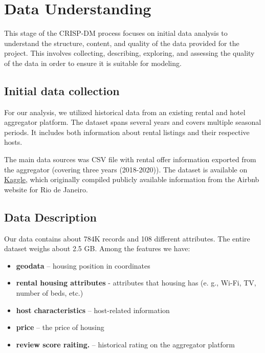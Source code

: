 

\section{Data Understanding}
\label{chap:dataUnderstanding}
This stage of the CRISP-DM process focuses on initial data analysis to understand the structure, content, and quality of the data provided for the project. This involves collecting, describing, exploring, and assessing the quality of the data in order to ensure it is suitable for modeling.

\subsection{Initial data collection  } 
\label{sec:initialDataCollection}
For our analysis, we utilized historical data from an existing rental and hotel aggregator platform. The dataset spans several years and covers multiple seasonal periods. It includes both information about rental listings and their respective hosts.

The main data sources was CSV file with rental offer information exported from the aggregator (covering three years (2018-2020)). The dataset is available on \href{https://www.kaggle.com/datasets/hazujaf/airbnb-price-prediction-in-rio-de-janeiro-python?resource=download}{Kaggle}\cite{airbnb_rio_kaggle}, which originally compiled publicly available information from the Airbnb website for Rio de Janeiro.

\subsection{Data Description }
\label{sec:dataDescription}
Our data contains about 784K records and 108 different attributes. The entire dataset weighs about 2.5 GB. 
Among the features we have:
\begin{itemize}
    \item \textbf{geodata} – housing position in coordinates
    \item \textbf{rental housing attributes} - attributes that housing has (e. g., Wi-Fi, TV, number of beds, etc.)
    \item \textbf{host characteristics} – host-related information
    \item \textbf{price} – the price of housing
    \item \textbf{review score raiting.} – historical rating on the aggregator platform
\end{itemize}

